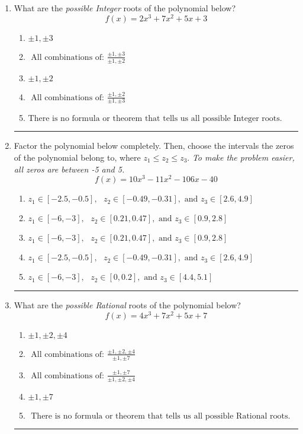 \documentclass[14pt]{extbook}
\newcommand{\litem}[1]{\item#1\hspace*{-1cm}\rule{\textwidth}{0.4pt}}
\begin{document}
\begin{enumerate}
\litem{
What are the \textit{possible Integer} roots of the polynomial below?\[ f(x) = 2x^{3} +7 x^{2} +5 x + 3 \]\begin{enumerate}[label=\Alph*.]
\item \( \pm 1,\pm 3 \)
\item \( \text{ All combinations of: }\frac{\pm 1,\pm 3}{\pm 1,\pm 2} \)
\item \( \pm 1,\pm 2 \)
\item \( \text{ All combinations of: }\frac{\pm 1,\pm 2}{\pm 1,\pm 3} \)
\item \( \text{There is no formula or theorem that tells us all possible Integer roots.} \)

\end{enumerate} }
\litem{
Factor the polynomial below completely. Then, choose the intervals the zeros of the polynomial belong to, where $z_1 \leq z_2 \leq z_3$. \textit{To make the problem easier, all zeros are between -5 and 5.}\[ f(x) = 10x^{3} -11 x^{2} -106 x -40 \]\begin{enumerate}[label=\Alph*.]
\item \( z_1 \in [-2.5, -0.5], \text{   }  z_2 \in [-0.49, -0.31], \text{   and   } z_3 \in [2.6, 4.9] \)
\item \( z_1 \in [-6, -3], \text{   }  z_2 \in [0.21, 0.47], \text{   and   } z_3 \in [0.9, 2.8] \)
\item \( z_1 \in [-6, -3], \text{   }  z_2 \in [0.21, 0.47], \text{   and   } z_3 \in [0.9, 2.8] \)
\item \( z_1 \in [-2.5, -0.5], \text{   }  z_2 \in [-0.49, -0.31], \text{   and   } z_3 \in [2.6, 4.9] \)
\item \( z_1 \in [-6, -3], \text{   }  z_2 \in [0, 0.2], \text{   and   } z_3 \in [4.4, 5.1] \)

\end{enumerate} }
\litem{
What are the \textit{possible Rational} roots of the polynomial below?\[ f(x) = 4x^{3} +7 x^{2} +5 x + 7 \]\begin{enumerate}[label=\Alph*.]
\item \( \pm 1,\pm 2,\pm 4 \)
\item \( \text{ All combinations of: }\frac{\pm 1,\pm 2,\pm 4}{\pm 1,\pm 7} \)
\item \( \text{ All combinations of: }\frac{\pm 1,\pm 7}{\pm 1,\pm 2,\pm 4} \)
\item \( \pm 1,\pm 7 \)
\item \( \text{ There is no formula or theorem that tells us all possible Rational roots.} \)


\end{enumerate}}
\end{enumerate}
\end{document}
